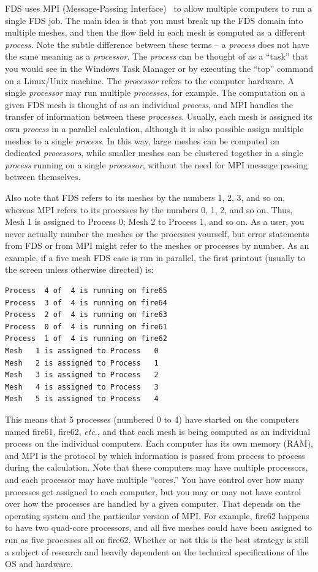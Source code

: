 \documentclass[11pt]{book}
\begin{document}
FDS uses MPI (Message-Passing Interface)~\cite{Gropp:1} to allow
multiple computers to run a single FDS job. The main idea is that you must break up the FDS domain into multiple meshes, and then
the flow field in each mesh is computed as a different {\em process.}
Note the subtle difference between these
terms -- a {\em process} does not have the same meaning as a {\em processor}.
The {\em process} can be thought of as a ``task'' that you would see in
the Windows Task Manager or by executing the ``top'' command on a Linux/Unix machine. The {\em processor} refers to the
computer hardware. A single
{\em processor} may run multiple {\em processes}, for example.
The computation on a given FDS mesh is thought of as an individual {\em process}, and
MPI handles the transfer of information between these {\em processes}.
Usually, each mesh is assigned its own {\em process} in a parallel calculation,
although it is also possible
assign multiple meshes to a single {\em process}.
In this way, large meshes can be computed on dedicated {\em processors}, while
smaller meshes can be clustered together in a single {\em process} running on a single {\em processor},
without the need for MPI message passing between themselves.

Also note that FDS refers to its meshes by the numbers 1, 2, 3, and so on, whereas MPI refers to its processes by the numbers
0, 1, 2, and so on. Thus, Mesh 1 is assigned to Process 0; Mesh 2 to Process 1, and so on.
As a user, you never actually number the meshes or the processes yourself, but
error statements from FDS or from MPI might refer to the meshes or processes by number.
As an example, if a five mesh FDS case is run in parallel, the first printout (usually to the screen unless
otherwise directed) is:

\footnotesize
\begin{verbatim}
Process  4 of  4 is running on fire65
Process  3 of  4 is running on fire64
Process  2 of  4 is running on fire63
Process  0 of  4 is running on fire61
Process  1 of  4 is running on fire62
Mesh   1 is assigned to Process   0
Mesh   2 is assigned to Process   1
Mesh   3 is assigned to Process   2
Mesh   4 is assigned to Process   3
Mesh   5 is assigned to Process   4
\end{verbatim} \normalsize
This means that 5 processes (numbered 0 to 4) have started on the computers named fire61, fire62, {\em etc}., and that each mesh is being computed as an individual process on the
individual computers. Each computer has its own memory (RAM), and MPI is the protocol by which information is passed from process to process during the calculation. Note that these
computers may have multiple processors, and each processor may have multiple ``cores.'' You have control over how many processes get assigned to each computer, but you may or may not
have control over how the processes are handled by a given computer. That depends on the operating system and the particular version of MPI. For example, fire62 happens to have
two quad-core processors, and all five meshes could have been assigned to run as five processes all on fire62. Whether or not this is the best strategy is still a subject of
research and heavily dependent on the technical specifications of the OS and hardware.
\end{document}
